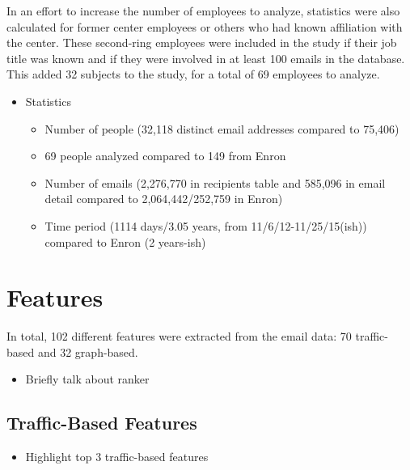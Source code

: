 \documentclass{article}
\begin{document}
\par
In an effort to increase the number of employees to analyze, statistics were also calculated for former center employees or others who had known affiliation with the center.  These second-ring employees were included in the study if their job title was known and if they were involved in at least 100 emails in the database.  This added 32 subjects to the study, for a total of 69 employees to analyze.

\begin{itemize}
\item Statistics
    \begin{itemize}
    \item Number of people (32,118 distinct email addresses compared to 75,406)
    \item 69 people analyzed compared to 149 from Enron
    \item Number of emails (2,276,770 in recipients table and 585,096 in email detail compared to 2,064,442/252,759 in Enron)
    \item Time period (1114 days/3.05 years, from 11/6/12-11/25/15(ish)) compared to Enron (2 years-ish)
    \end{itemize}
\end{itemize}



\section{Features} \label{Features}
In total, 102 different features were extracted from the email data: 70 traffic-based and 32 graph-based.
\begin{itemize}
\item Briefly talk about ranker
\end{itemize}
\subsection{Traffic-Based Features}
\begin{itemize}
\item Highlight top 3 traffic-based features
\end{itemize}
\end{document}
